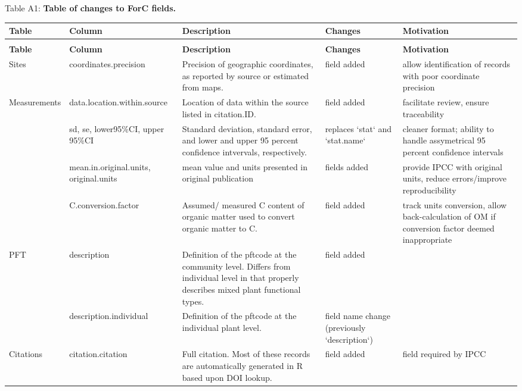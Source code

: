 \documentclass[, manuscript]{copernicus}
\begin{document}
\captionsetup[table]{labelformat=empty}

Table A1: \textbf{Table of changes to ForC fields.}

\begin{longtabu} to 
\hline
\textbf{Table} & \textbf{Column} & \textbf{Description} & \textbf{Changes} & \textbf{Motivation}\\
\hline
\endfirsthead
{}\\
\hline
\textbf{Table} & \textbf{Column} & \textbf{Description} & \textbf{Changes} & \textbf{Motivation}\\
\hline
\endhead
Sites & coordinates.precision & Precision of geographic coordinates, as reported by source or estimated from maps. & field added & allow identification of records with poor coordinate precision\\
\hline
Measurements & data.location.within.source & Location of data within the source listed in citation.ID. & field added & facilitate review, ensure traceability\\
\hline
 & sd, se, lower95\%CI, upper 95\%CI & Standard deviation, standard error, and lower and upper 95 percent confidence intvervals, respectively. & replaces `stat` and `stat.name` & cleaner format; ability to handle assymetrical 95 percent confidence intervals\\
\hline
 & mean.in.original.units, original.units & mean value and units presented in original publication & fields added & provide IPCC with original units, reduce errors/improve reproducibility\\
\hline
 & C.conversion.factor & Assumed/ measured C content of organic matter used to convert organic matter to C. & field added & track units conversion, allow back-calculation of OM if conversion factor deemed inappropriate\\
\hline
PFT & description & Definition of the pftcode at the community level. Differs from individual level in that properly describes mixed plant functional types. & field added & \\
\hline
 & description.individual & Definition of the pftcode at the individual plant level. & field name change (previously `description`) & \\
\hline
Citations & citation.citation & Full citation. Most of these records are automatically generated in R based upon DOI lookup. & field added & field required by IPCC\\

\end{longtabu}
\end{document}
